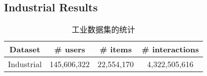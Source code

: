 

\subsection{Industrial Results}

\begin{table}
  \centering
  \caption{\label{tab:industrial_stats} 工业数据集的统计}
  \begin{tabular}{c|c|c|c}
    \hline \hline
    \textbf{Dataset} & \# users & \# items & \# interactions \\
    \hline
    Industrial & 145,606,322 & 22,554,170 & 4,322,505,616 \\
    \hline \hline
  \end{tabular}
\end{table}




